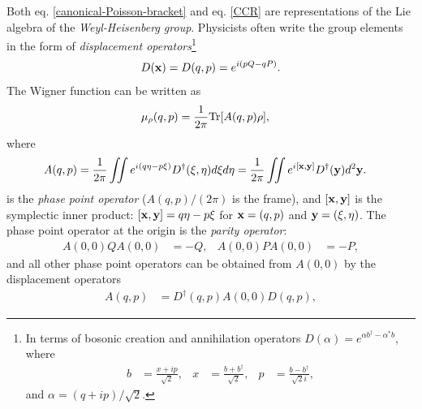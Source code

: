 Both eq. \eqref{canonical-Poisson-bracket} and eq. \eqref{CCR} are representations of the Lie algebra of the \emph{Weyl-Heisenberg group}. %
Physicists often write the group elements in the form of \emph{displacement operators}\footnote{In terms of bosonic creation and annihilation operators $D(\alpha) = e^{\alpha b^{\dagger} - \alpha^* b}$, where
\begin{align}
	b &= \frac{x + ip}{\sqrt{2}}, &
	x &= \frac{b+b^{\dagger}}{\sqrt{2}}, &
	p &= \frac{b-b^{\dagger}}{\sqrt{2}i},
\end{align}
and $\alpha = (q+ip)/\sqrt{2}$.
}
\begin{align}\label{displacement-operator}
D({\bf x}) = D(q,p) = e^{i(pQ - qP)}.
\end{align}
The Wigner function can be written as
\begin{align}
\mu_{\rho}(q,p) &= \frac{1}{2\pi} \mathrm{Tr} [A(q,p) \rho],
\end{align}
where
\begin{align}
A(q,p) &= \frac{1}{2\pi} \iint e^{i(q\eta - p\xi)} D^{\dagger}(\xi,\eta) d\xi d\eta
	= \frac{1}{2\pi} \iint e^{i[{\bf x}, {\bf y}]} D^{\dagger}({\bf y}) d^2{\bf y}.
\end{align}
is the \emph{phase point operator} ($A(q,p)/(2\pi)$ is the frame), and $[{\bf x}, {\bf y}]$ is the symplectic inner product: $[{\bf x}, {\bf y}] = q\eta - p\xi$ for ${\bf x} = (q,p)$ and ${\bf y} = (\xi,\eta)$. The phase point operator at the origin is the \emph{parity operator}:
\begin{align}
	A(0,0)QA(0,0) &= -Q, & A(0,0)PA(0,0) &= -P,
\end{align}
and all other phase point operators can be obtained from $A(0,0)$ by the displacement operators
\begin{align}
	A(q,p) &= D^{\dagger}(q,p) A(0,0) D(q,p),
\end{align}

